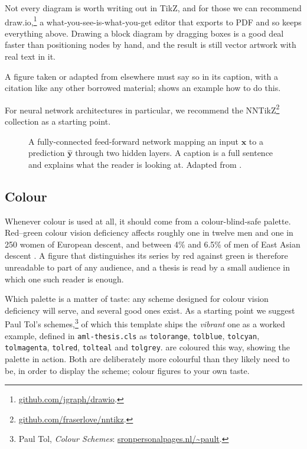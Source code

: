 Not every diagram is worth writing out in TikZ, and for those we can recommend
draw.io,\footnote{\href{https://github.com/jgraph/drawio}{github.com/jgraph/drawio}.}
a what-you-see-is-what-you-get editor that exports to PDF and so keeps
everything above. Drawing a block diagram by dragging boxes is a good deal
faster than positioning nodes by hand, and the result is still vector artwork
with real text in it.

A figure taken or adapted from elsewhere must say so in its caption, with a
citation like any other borrowed material;  shows an example how to do this.

For neural network architectures in particular, we recommend the
NNTikZ\footnote{\href{https://github.com/fraserlove/nntikz}{github.com/fraserlove/nntikz}.}
collection \parencite{love2024nntikz} as a starting point.


\begin{figure}
\centering

\caption[A fully-connected feed-forward network]{A fully-connected
feed-forward network mapping an input $\bm{x}$ to a
prediction $\hat{\bm{y}}$ through two hidden layers. A caption is a full
sentence and explains what the reader is looking at. Adapted from
\textcite{love2024nntikz}.}
\label{fig:neural_network}
\end{figure}

\subsection{Colour}
\label{sec:colour}

Whenever colour is used at all, it should come from a colour-blind-safe
palette.  Red--green colour vision deficiency affects roughly
one in twelve men and one in 250 women of European descent, and between
4\% and 6.5\% of men of East Asian descent \parencite{birch2012worldwide}.
A figure that distinguishes its series by red against green is therefore
unreadable to part of any audience, and a thesis is read by a small audience
in which one such reader is enough.

Which palette is a matter of taste: any scheme designed for colour vision
deficiency will serve, and several good ones exist. As a starting point we
suggest Paul Tol's schemes,\footnote{Paul Tol, \emph{Colour Schemes}:
\href{https://sronpersonalpages.nl/~pault/}{sronpersonalpages.nl/\textasciitilde pault}.}
of which this template ships the \emph{vibrant} one as a worked example,
defined in \texttt{aml-thesis.cls} as
\textcolor{tolorange}{\texttt{tolorange}},
\textcolor{tolblue}{\texttt{tolblue}},
\textcolor{tolcyan}{\texttt{tolcyan}},
\textcolor{tolmagenta}{\texttt{tolmagenta}},
\textcolor{tolred}{\texttt{tolred}},
\textcolor{tolteal}{\texttt{tolteal}} and
\textcolor{tolgrey}{\texttt{tolgrey}}. 
are coloured this way, showing the palette in action. Both are deliberately
more colourful than they likely need to be, in order to display the scheme; colour
figures to your own taste.

